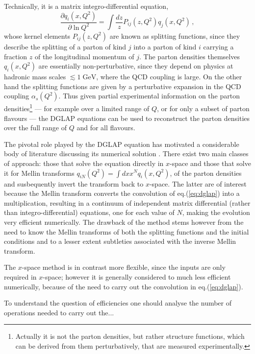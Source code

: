 \documentclass[12pt]{article}
\newcommand{\GeV}{\;\mathrm{GeV}}
\newcommand{\as}{\alpha_s}
\begin{document}
Technically, it is a matrix integro-differential equation,
\begin{equation}
  \label{eq:dglap}
  \frac{\partial q_i(x,Q^2)}{\partial \ln Q^2} = \int \frac{dz}{z}
  P_{ij}(z,Q^2) q_j(x,Q^2)\,,
\end{equation}
whose kernel elements $P_{ij}(z,Q^2)$ are known as splitting
functions, since they describe the splitting of a parton of kind $j$
into a parton of kind $i$ carrying a fraction $z$ of the longitudinal
momentum of $j$. The parton densities themselves $q_i(x,Q^2)$ are
essentially non-perturbative, since they depend on physics at hadronic
mass scales $\lesssim 1 \GeV$, where the QCD coupling is large. On the
other hand the splitting functions are given by a perturbative
expansion in the QCD coupling $\as(Q^2)$. Thus given partial
experimental information on the parton densities\footnote{Actually it
  is not the parton densities, but rather structure functions, which
  can be derived from them perturbatively, that are measured
  experimentally.} %
--- for example over a limited range of $Q$, or for only a subset of
parton flavours --- the DGLAP equations can be used to reconstruct the
parton densities over the full range of $Q$ and for all flavours.

The pivotal role played by the DGLAP equation has motivated a
considerable body of literature discussing its numerical solution
\cite{AllDGLAP}. There exist two main classes of approach: those that
solve the equation directly in $x$-space and those that solve it for
Mellin transforms $q_{iN}(Q^2) = \int dx x^N q_i(x,Q^2)$, of the
parton densities and susbequently invert the transform back to
$x$-space. The latter are of interest because the Mellin transform
converts the convolution of eq.(\ref{eq:dglap}) into a multiplication,
resulting in a continuum of independent matrix differential (rather
than integro-differential) equations, one for each value of $N$,
making the evolution very efficient numerically. The drawback of the
method stems however from the need to know the Mellin transforms of
both the splitting functions and the initial conditions and to a
lesser extent subtleties associated with the inverse Mellin transform.

The $x$-space method is in contrast more flexible, since the inputs
are only required in $x$-space; however it is generally considered to
much less efficient numerically, because of the need to carry out the
convolution in eq.(\ref{eq:dglap}).

To understand the question of efficiencies one should analyse the
number of operations needed to carry out the...
\end{document}
